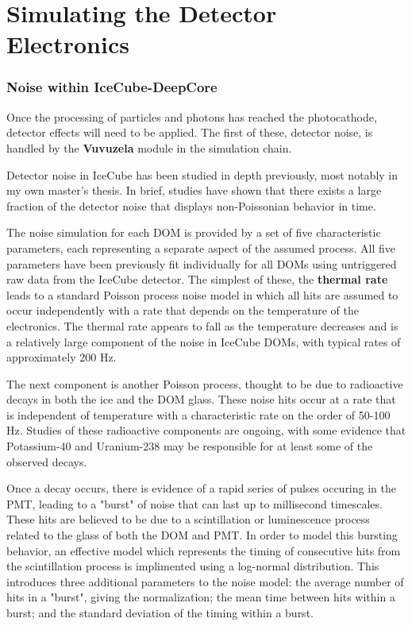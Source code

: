 \section{Simulating the Detector Electronics}
\subsubsection{Noise within IceCube-DeepCore}
Once the processing of particles and photons has reached the photocathode, detector effects will need to be applied. 
The first of these, detector noise, is handled by the \textbf{Vuvuzela} module in the simulation chain. 

Detector noise in IceCube has been studied in depth previously, most notably in my own master's thesis. 
In brief, studies have shown that there exists a large fraction of the detector noise that displays non-Poissonian behavior in time.

The noise simulation for each DOM is provided by a set of five characteristic parameters, each representing a separate aspect of the assumed process. 
All five parameters have been previously fit individually for all DOMs using untriggered raw data from the IceCube detector. 
The simplest of these, the \textbf{thermal rate} leads to a standard Poisson process noise model in which all hits are assumed to occur independently with a rate that depends on the temperature of the electronics. 
The thermal rate appears to fall as the temperature decreases and is a relatively large component of the noise in IceCube DOMs, with typical rates of approximately 200 Hz.

The next component is another Poisson process, thought to be due to radioactive decays in both the ice and the DOM glass. 
These noise hits occur at a rate that is independent of temperature with a characteristic rate on the order of 50-100 Hz. 
Studies of these radioactive components are ongoing, with some evidence that Potassium-40 and Uranium-238 may be responsible for at least some of the observed decays.

Once a decay occurs, there is evidence of a rapid series of pulses occuring in the PMT, leading to a "burst" of noise that can last up to millisecond timescales. 
These hits are believed to be due to a scintillation or luminescence process related to the glass of both the DOM and PMT. 
In order to model this bursting behavior, an effective model which represents the timing of consecutive hits from the scintillation process is implimented using a log-normal distribution. 
This introduces three additional parameters to the noise model: the average number of hits in a "burst", giving the normalization; the mean time between hits within a burst; and the standard deviation of the timing within a burst. 

